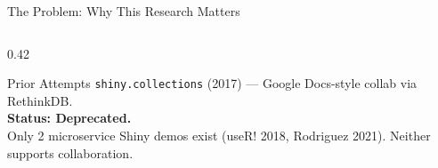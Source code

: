 \documentclass[aspectratio=169]{beamer}
\begin{document}
\begin{frame}{The Problem: Why This Research Matters}
\begin{columns}[T]
\begin{column}{0.42\textwidth}
\vspace{0.5em}
\begin{alertblock}{Prior Attempts}
\small
\texttt{shiny.collections} (2017) --- Google Docs-style collab via RethinkDB.\\[0.3em]
\textbf{Status: Deprecated.}\\[0.3em]
Only 2 microservice Shiny demos exist (useR! 2018, Rodriguez 2021). Neither supports collaboration.
\end{alertblock}

\end{column}
\end{columns}

\end{frame}

\end{document}
